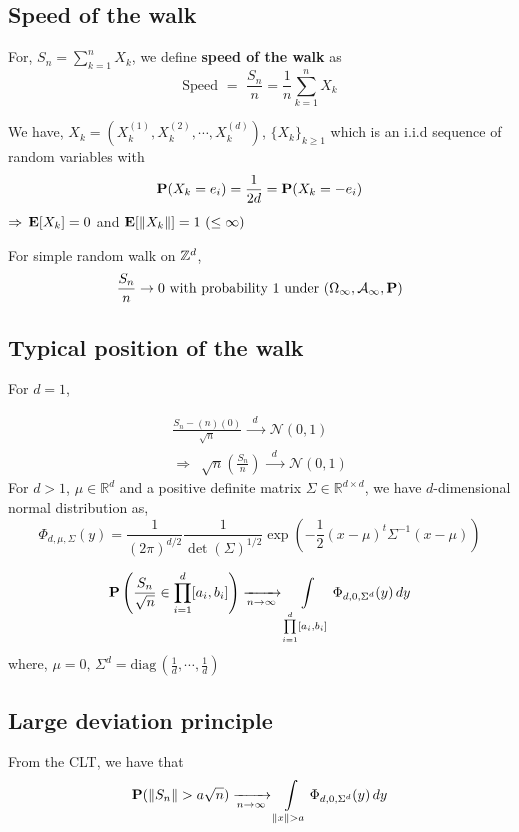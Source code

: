 \documentclass[main]{subfiles}
\begin{document}
\subsection{Speed of the walk}
\begin{definition}
    \normalfont
    For, $S_n = \sum\limits_{k=1}^{n}X_k$, we define \textbf{speed of the walk} as $$\text{Speed}\,\,=\,\, \frac{S_n}{n}=\frac{1}{n}\sum\limits_{k=1}^{n}X_k$$
\end{definition}

We have, $X_k = \left(X_k^{(1)},X_k^{(2)},\cdots,X_k^{(d)}\right)$, $\{X_k\}_{k \geq 1}$ which is an i.i.d sequence of random variables with
$$\P(X_k = e_i) = \frac{1}{2d} = \P(X_k = -e_i)$$
$\Rightarrow\,\E[X_k] = 0$ and $\E[\lVert X_k \rVert] = 1\,\,(\leq \infty)$

\begin{theorem}
    \normalfont
    For simple random walk on $\Z^d$,
    $$\frac{S_n}{n} \rightarrow 0\,\,\text{with probability}\,\,1\,\,\text{under}\,\,(\Omega_{\infty},\mathcal{A}_{\infty},\P)$$
\end{theorem}

\subsection{Typical position of the walk}
For $d=1$,

\begin{align*}
    \frac{S_n - (n)(0)}{\sqrt{n}} \xrightarrow{\,\,\,\,d\,\,\,\,\,} \mathcal{N}(0,1) \\
    \Rightarrow	\,\,\, \sqrt{n}\left(\frac{S_n}{n}\right)  \xrightarrow{\,\,\,\,d\,\,\,\,\,}  \mathcal{N}(0,1)
\end{align*}
For $d >1$, $\mu \in \mathbb{R}^d$ and a positive definite matrix $\Sigma \in \mathbb{R}^{d \times d}$, we have $d$-dimensional normal distribution as,
$$\Phi_{d,\mu,\Sigma}(y) = \frac{1}{(2 \pi)^{d/2}} \frac{1}{\det(\Sigma)^{1/2}} \exp \left(-\frac{1}{2}(x-\mu)^{t} \Sigma^{-1} (x- \mu)\right)$$

$$\P \left(\frac{S_n}{\sqrt{n}}\in \prod\limits_{i=1}^{d} [a_i,b_i] \right)  \xrightarrow[n \to \infty]{}  \int\limits_{\prod\limits_{i=1}^{d} [a_i,b_i]} \Phi_{d,0,\Sigma^d}(y) \,dy$$
where, $\mu =0,\,
    \Sigma^d =  \text{diag}\,(\frac{1}{d},\cdots,\frac{1}{d})$
\subsection{Large deviation principle}
From the CLT, we have that
$$\P(\lVert S_n \rVert > a\sqrt{n}) \xrightarrow[n \to \infty]{} \int\limits_{\lVert x \rVert >a} \Phi_{d,0,\Sigma^d}(y) \,dy$$
\end{document}
